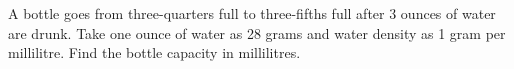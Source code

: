 A bottle goes from three-quarters full to three-fifths full after 3 ounces of water are drunk. Take one ounce of water as 28 grams and water density as 1 gram per millilitre. Find the bottle capacity in millilitres.
